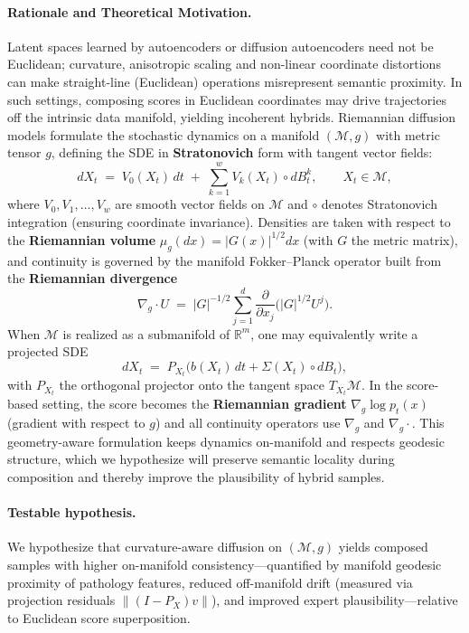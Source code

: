 \paragraph{Rationale and Theoretical Motivation.}
Latent spaces learned by autoencoders or diffusion autoencoders need not be Euclidean; curvature, anisotropic scaling and non-linear coordinate distortions can make straight-line (Euclidean) operations misrepresent semantic proximity. In such settings, composing scores in Euclidean coordinates may drive trajectories off the intrinsic data manifold, yielding incoherent hybrids.  
Riemannian diffusion models \citep{NEURIPS2022_123d3e81} formulate the stochastic dynamics on a manifold \((\mathcal M,g)\) with metric tensor \(g\), defining the SDE in \textbf{Stratonovich} form with tangent vector fields:
\[
dX_t \;=\; V_0(X_t)\,dt \;+\; \sum_{k=1}^{w} V_k(X_t)\circ dB_t^{k}, 
\qquad X_t\in\mathcal M,
\]
where \(V_0,V_1,\dots,V_w\) are smooth vector fields on \(\mathcal M\) and \(\circ\) denotes Stratonovich integration (ensuring coordinate invariance). Densities are taken with respect to the \textbf{Riemannian volume} \(\mu_g(dx)=|G(x)|^{1/2}dx\) (with \(G\) the metric matrix), and continuity is governed by the manifold Fokker–Planck operator built from the \textbf{Riemannian divergence} 
\[
\nabla_g\!\cdot U \;=\; |G|^{-1/2}\sum_{j=1}^d \frac{\partial}{\partial x_j}\!\Big(|G|^{1/2}U^j\Big).
\]
When \(\mathcal M\) is realized as a submanifold of \(\mathbb R^m\), one may equivalently write a projected SDE
\[
dX_t \;=\; P_{X_t}\!\Big(b(X_t)\,dt + \Sigma(X_t)\circ dB_t\Big),
\]
with \(P_{X_t}\) the orthogonal projector onto the tangent space \(T_{X_t}\mathcal M\).  
In the score-based setting, the score becomes the \textbf{Riemannian gradient} \(\nabla_g \log p_t(x)\) (gradient with respect to \(g\)) and all continuity operators use \(\nabla_g\) and \(\nabla_g\!\cdot\). This geometry-aware formulation keeps dynamics on-manifold and respects geodesic structure, which we hypothesize will preserve semantic locality during composition and thereby improve the plausibility of hybrid samples.

\paragraph{Testable hypothesis.}
We hypothesize that curvature-aware diffusion on \((\mathcal M,g)\) yields composed samples with higher on-manifold consistency—quantified by manifold geodesic proximity of pathology features, reduced off-manifold drift (measured via projection residuals \(\|(I-P_{X})v\|\)), and improved expert plausibility—relative to Euclidean score superposition.

